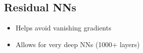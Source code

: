 \subsection{Residual NNs}

\begin{itemize}
    \item Helps avoid vanishing gradients
    \item Allows for very deep NNs (1000+ layers)
\end{itemize}
